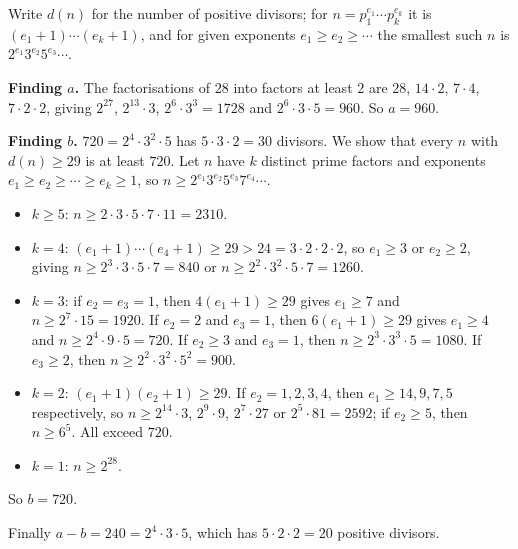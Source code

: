 Write $d(n)$ for the number of positive divisors; for $n=p_1^{e_1}\cdots p_k^{e_k}$ it is $(e_1+1)\cdots(e_k+1)$, and for given exponents $e_1\ge e_2\ge\cdots$ the smallest such $n$ is $2^{e_1}3^{e_2}5^{e_3}\cdots$.

\textbf{Finding $a$.} The factorisations of $28$ into factors at least $2$ are $28$, $14\cdot2$, $7\cdot4$, $7\cdot2\cdot2$, giving $2^{27}$, $2^{13}\cdot3$, $2^6\cdot3^3=1728$ and $2^6\cdot3\cdot5=960$. So $a=960$.

\textbf{Finding $b$.} $720=2^4\cdot3^2\cdot5$ has $5\cdot3\cdot2=30$ divisors. We show that every $n$ with $d(n)\ge29$ is at least $720$. Let $n$ have $k$ distinct prime factors and exponents $e_1\ge e_2\ge\cdots\ge e_k\ge1$, so $n\ge2^{e_1}3^{e_2}5^{e_3}7^{e_4}\cdots$.
\begin{itemize}
\item $k\ge5$: $n\ge2\cdot3\cdot5\cdot7\cdot11=2310$.
\item $k=4$: $(e_1+1)\cdots(e_4+1)\ge29>24=3\cdot2\cdot2\cdot2$, so $e_1\ge3$ or $e_2\ge2$, giving $n\ge2^3\cdot3\cdot5\cdot7=840$ or $n\ge2^2\cdot3^2\cdot5\cdot7=1260$.
\item $k=3$: if $e_2=e_3=1$, then $4(e_1+1)\ge29$ gives $e_1\ge7$ and $n\ge2^7\cdot15=1920$. If $e_2=2$ and $e_3=1$, then $6(e_1+1)\ge29$ gives $e_1\ge4$ and $n\ge2^4\cdot9\cdot5=720$. If $e_2\ge3$ and $e_3=1$, then $n\ge2^3\cdot3^3\cdot5=1080$. If $e_3\ge2$, then $n\ge2^2\cdot3^2\cdot5^2=900$.
\item $k=2$: $(e_1+1)(e_2+1)\ge29$. If $e_2=1,2,3,4$, then $e_1\ge14,9,7,5$ respectively, so $n\ge2^{14}\cdot3$, $2^9\cdot9$, $2^7\cdot27$ or $2^5\cdot81=2592$; if $e_2\ge5$, then $n\ge6^5$. All exceed $720$.
\item $k=1$: $n\ge2^{28}$.
\end{itemize}
So $b=720$.

Finally $a-b=240=2^4\cdot3\cdot5$, which has $5\cdot2\cdot2=\boxed{20}$ positive divisors.
